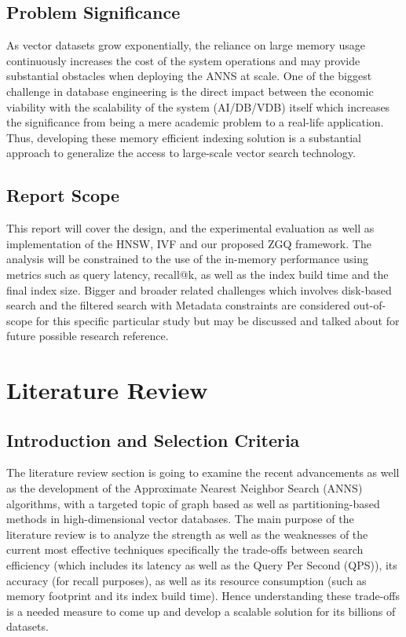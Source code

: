 \documentclass[conference]{IEEEtran}
\begin{document}
\subsection{Problem Significance}
As vector datasets grow exponentially, the reliance on large memory usage continuously increases the cost of the system operations and may provide substantial obstacles when deploying the ANNS at scale. One of the biggest challenge in database engineering is the direct impact between the economic viability with the scalability of the system (AI/DB/VDB) itself which increases the significance from being a mere academic problem to a real-life application. Thus, developing these memory efficient indexing solution is a substantial approach to generalize the access to large-scale vector search technology.

\subsection{Report Scope}
This report will cover the design, and the experimental evaluation as well as implementation of the HNSW, IVF and our proposed ZGQ framework. The analysis will be constrained to the use of the in-memory performance using metrics such as query latency, recall@k, as well as the index build time and the final index size. Bigger and broader related challenges which involves disk-based search and the filtered search with Metadata constraints are considered out-of-scope for this specific particular study but may be discussed and talked about for future possible research reference.

\section{Literature Review}

\subsection{Introduction and Selection Criteria}
The literature review section is going to examine the recent advancements as well as the development of the Approximate Nearest Neighbor Search (ANNS) algorithms, with a targeted topic of graph based as well as partitioning-based methods in high-dimensional vector databases. The main purpose of the literature review is to analyze the strength as well as the weaknesses of the current most effective techniques specifically the trade-offs between search efficiency (which includes its latency as well as the Query Per Second (QPS)), its accuracy (for recall purposes), as well as its resource consumption (such as memory footprint and its index build time). Hence understanding these trade-offs is a needed measure to come up and develop a scalable solution for its billions of datasets.
\end{document}
